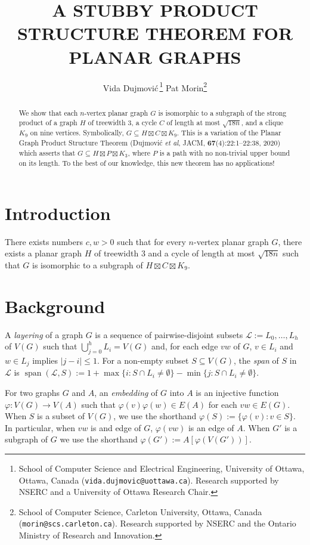 \documentclass{patmorin}
\title{\MakeUppercase{\boldmath A Stubby Product Structure Theorem for Planar Graphs}}
\author{
 Vida Dujmovi{\'c}\,\footnote{School of Computer Science and Electrical Engineering, University of Ottawa, Ottawa, Canada (\texttt{vida.dujmovic@uottawa.ca}). Research supported by NSERC and a University of Ottawa Research Chair.}
 \qquad
 Pat Morin\footnote{School of Computer Science, Carleton University, Ottawa, Canada (\texttt{morin@scs.carleton.ca}). Research supported by NSERC and the Ontario Ministry of Research and Innovation.}
 }
\date{}
\newcommand{\defin}[1]{\emph{\textcolor{brightmaroon}{#1}}}
\DeclareMathOperator{\spn}{span}
\begin{document}
\maketitle

\begin{abstract}
  We show that each $n$-vertex planar graph $G$ is isomorphic to a subgraph of the strong product of a graph $H$ of treewidth $3$, a cycle $C$ of length at most $\sqrt{18n}$, and a clique $K_9$ on nine vertices.  Symbolically, $G\subseteq H\boxtimes C\boxtimes K_9$. This is a variation of the Planar Graph Product Structure Theorem (Dujmović \emph{et al}, JACM, \textbf{67}(4):22:1–22:38, 2020) which asserts that $G\subseteq H\boxtimes P\boxtimes K_3$, where $P$ is a path with no non-trivial upper bound on its length.  To the best of our knowledge, this new theorem has no applications!
\end{abstract}

\section{Introduction}




\begin{thm}\label{main_thm}
  There exists numbers $c,w>0$ such that for every $n$-vertex planar graph $G$, there exists a planar graph $H$ of treewidth $3$ and a cycle of length at most $\sqrt{18n}$ such that $G$ is isomorphic to a subgraph of $H\boxtimes C\boxtimes K_9$.
\end{thm}




\section{Background}

A \defin{layering} of a graph $G$ is a sequence of pairwise-disjoint subsets $\mathcal{L}:=L_0,\ldots,L_h$ of $V(G)$ such that $\bigcup_{j=0}^h L_i=V(G)$ and, for each edge $vw$ of $G$, $v\in L_i$ and $w\in L_j$ implies $|j-i|\le 1$.  For a non-empty subset $S\subseteq V(G)$, the \defin{span} of $S$ in $\mathcal{L}$ is $\spn(\mathcal{L},S):=1+\max\{i:S\cap L_i\neq\emptyset\}-\min\{j:S\cap L_i\neq\emptyset\}$.


For two graphs $G$ and $A$, an \defin{embedding} of $G$ into $A$ is an injective function $\varphi:V(G)\to V(A)$ such that $\varphi(v)\varphi(w)\in E(A)$ for each $vw\in E(G)$.  When $S$ is a subset of $V(G)$, we use the shorthand $\varphi(S):=\{\varphi(v):v\in S\}$.  In particular, when $vw$ is and edge of $G$, $\varphi(vw)$ is an edge of $A$.  When $G'$ is a subgraph of $G$ we use the shorthand $\varphi(G'):=A[\varphi(V(G'))]$.
\end{document}
